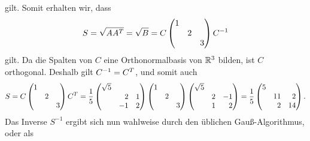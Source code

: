 gilt.
Somit erhalten wir, dass
\[
    S
  = \sqrt{A A^T}
  = \sqrt{B}
  = C
    \begin{pmatrix}
      1 &   &   \\
        & 2 &   \\
        &   & 3
    \end{pmatrix}
    C^{-1}
\]
gilt.
Da die Spalten von $C$ eine Orthonormalbasis von $\mathbb{R}^3$ bilden, ist $C$ orthogonal.
Deshalb gilt $C^{-1} = C^T$, und somit auch 
\[
    S
  = C
    \begin{pmatrix}
      1 &   &   \\
        & 2 &   \\
        &   & 3
    \end{pmatrix}
    \transpose{C}
  = \frac{1}{5}
    \begin{pmatrix*}[r]
      \sqrt{5}  &     &   \\
                &  2  & 1 \\
                & -1  & 2
    \end{pmatrix*}
    \begin{pmatrix}
      1 &   &   \\
        & 2 &   \\
        &   & 3
    \end{pmatrix}
    \begin{pmatrix*}[r]
      \sqrt{5}  &     &     \\
                &  2  & -1  \\
                &  1  &  2
    \end{pmatrix*}
  = \frac{1}{5}
    \begin{pmatrix*}[r]
      5 &     &     \\
        & 11  &  2  \\
        &  2  & 14
    \end{pmatrix*}.
\]
Das Inverse $S^{-1}$ ergibt sich nun wahlweise durch den üblichen Gauß-Algorithmus, oder als
